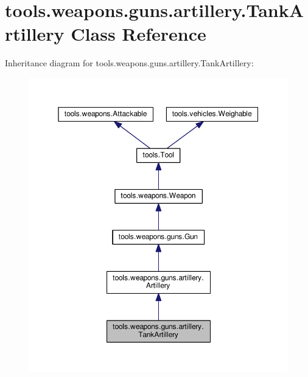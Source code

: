 \hypertarget{classtools_1_1weapons_1_1guns_1_1artillery_1_1_tank_artillery}{}\section{tools.\+weapons.\+guns.\+artillery.\+Tank\+Artillery Class Reference}
\label{classtools_1_1weapons_1_1guns_1_1artillery_1_1_tank_artillery}


Inheritance diagram for tools.\+weapons.\+guns.\+artillery.\+Tank\+Artillery\+:
\nopagebreak
\begin{figure}[H]
\begin{center}
\leavevmode
\includegraphics[width=350pt]{classtools_1_1weapons_1_1guns_1_1artillery_1_1_tank_artillery__inherit__graph}
\end{center}
\end{figure}


